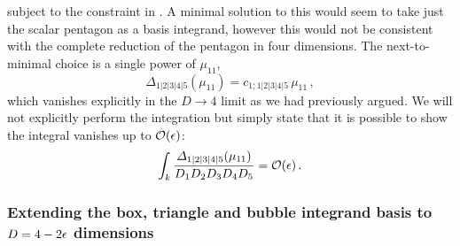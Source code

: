 subject to the constraint in . A minimal solution
to this would seem to take just the scalar pentagon as a basis integrand,
however this would not be consistent with the complete reduction of the
pentagon in four dimensions. The next-to-minimal choice is a single power of $\mu_{11}$,
\begin{equation}
  \Delta_{1|2|3|4|5}(\mu_{11}) = c_{1;1|2|3|4|5} \, \mu_{11} \,,
\end{equation}
which vanishes explicitly in the $D\to 4$ limit as we had previously argued. We
will not explicitly perform the integration but simply state that it is
possible to show the integral vanishes up to $\mathcal{O}(\epsilon)$: 
\begin{equation}
  \int_k \frac{\Delta_{1|2|3|4|5}(\mu_{11})}{D_1 D_2 D_3 D_4 D_5}  = \mathcal{O}(\eps) \,. 
\end{equation}

\subsubsection{Extending the box, triangle and bubble integrand basis to $D=4-2\epsilon$ dimensions}

